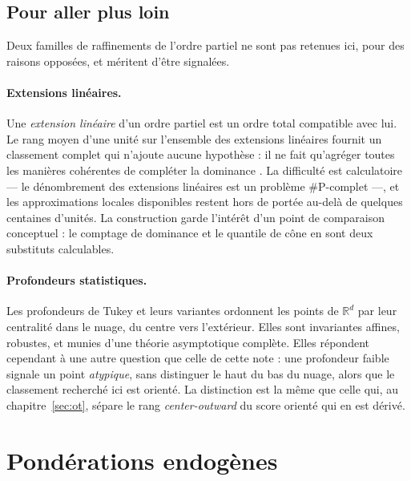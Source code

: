\documentclass[11pt,a4paper]{article}
\theoremstyle{definition}
\theoremstyle{remark}
\newcommand{\R}{\mathbb{R}}
\begin{document}
\bigskip

\subsection{Pour aller plus loin}
\label{sec:ordres-plus}

\medskip

Deux familles de raffinements de l'ordre partiel ne sont pas retenues ici, pour des
raisons opposées, et méritent d'être signalées.

\medskip

\paragraph{Extensions linéaires.} Une \emph{extension linéaire} d'un ordre partiel est un
ordre total compatible avec lui. Le rang moyen d'une unité sur l'ensemble des extensions
linéaires fournit un classement complet qui n'ajoute aucune hypothèse : il ne fait
qu'agréger toutes les manières cohérentes de compléter la dominance
\citep{bruggemann2011, fattore2016}. La difficulté est calculatoire --- le dénombrement
des extensions linéaires est un problème $\#$P-complet ---, et les approximations locales
disponibles \citep{deloof2006} restent hors de portée au-delà de quelques centaines
d'unités. La construction garde l'intérêt d'un point de comparaison conceptuel : le
comptage de dominance et le quantile de cône en sont deux substituts calculables.

\bigskip

\paragraph{Profondeurs statistiques.} Les profondeurs de Tukey et leurs variantes
\citep{tukey1975, zuo2000, mosler2013} ordonnent les points de $\R^d$ par leur centralité
dans le nuage, du centre vers l'extérieur. Elles sont invariantes affines, robustes, et
munies d'une théorie asymptotique complète. Elles répondent cependant à une autre
question que celle de cette note : une profondeur faible signale un point
\emph{atypique}, sans distinguer le haut du bas du nuage, alors que le classement
recherché ici est orienté. La distinction est la même que celle qui, au
chapitre~\ref{sec:ot}, sépare le rang \emph{center-outward} du score orienté qui en est
dérivé.

\section{Pondérations endogènes}
\label{sec:poids}
\end{document}
